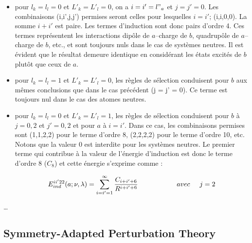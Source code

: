 	\begin{itemize}
		\item pour $l_{k}=l_{l}=0$ et  $L'_{k}=L'_{l}=0$, on a $i=i'=l"_{a}$ et $j=j'=0$. Les combinaisons (i,i',j,j') permises seront celles pour lesquelles $i = i'$; (i,i,0,0). La somme $i + i'$ est paire. Les termes d'induction sont donc pairs d'ordre 4. Ces termes représentent les interactions dipôle de $a$--charge de $b$, quadrupôle de $a$--charge de $b$, etc., et sont toujours nuls dans le cas de systèmes neutres. Il est évident que le résultat demeure identique en considérant les états excités de $b$ plutôt que ceux de $a$. 
		\item pour $l_{k} = l_{l} = 1 $ et  $L'_{k} = L'_{l} = 0$, les règles de sélection conduisent pour $b$ aux mêmes conclusions que dans le cas précédent (j = j' = 0). Ce terme est toujours nul dans le cas des atomes neutres.
		\item pour $l_{k} = l_{l} = 0 $ et  $L'_{k} = L'_{l} = 1$, les règles de sélection conduisent pour $b$ à $j=0, 2$ et $j'=0, 2$ et pour $a$ à $i = i'$. Dans ce cas, les combinaisons permises sont (1,1,2,2) pour le terme d'ordre 8, (2,2,2,2) pour le terme d'ordre 10, etc. Notons que la valeur 0 est interdite pour les systèmes neutres. Le premier terme qui contribue à la valeur de l'énergie d'induction est donc le terme d'ordre 8 ($C_{8}$) et cette énergie s'exprime comme : 
		
		\begin{equation}
		E_{ind}^{ii'22} (a;\nu , \lambda) = \sum_{i=i'=1}^{\infty} \frac{C_{i+i'+6}}{R^{i+i'+6}} \hspace{2cm} avec \hspace{0.5cm} j = 2
		\end{equation}
		
	\end{itemize}
	
	\ldots
	
	
	\subsection[SAPT]{Symmetry-Adapted Perturbation Theory}
	
